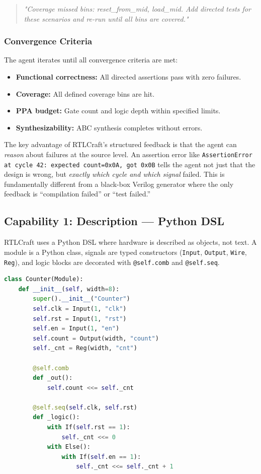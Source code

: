 \documentclass[11pt]{article}
\begin{document}
\begin{quote}
\small\textit{"Coverage missed bins: reset\_from\_mid, load\_mid. Add directed tests for these scenarios and re-run until all bins are covered."}
\end{quote}

\subsubsection{Convergence Criteria}

The agent iterates until all convergence criteria are met:

\begin{itemize}
    \item \textbf{Functional correctness:} All directed assertions pass with zero failures.
    \item \textbf{Coverage:} All defined coverage bins are hit.
    \item \textbf{PPA budget:} Gate count and logic depth within specified limits.
    \item \textbf{Synthesizability:} ABC synthesis completes without errors.
\end{itemize}

The key advantage of RTLCraft's structured feedback is that the agent can \textit{reason} about failures at the source level. An assertion error like \texttt{AssertionError at cycle 42: expected count=0x0A, got 0x0B} tells the agent not just that the design is wrong, but \textit{exactly which cycle and which signal} failed. This is fundamentally different from a black-box Verilog generator where the only feedback is ``compilation failed'' or ``test failed.''

\subsection{Capability 1: Description --- Python DSL}
\label{sec:cap_desc}

RTLCraft uses a Python DSL where hardware is described as objects, not text. A module is a Python class, signals are typed constructors (\texttt{Input}, \texttt{Output}, \texttt{Wire}, \texttt{Reg}), and logic blocks are decorated with \texttt{@self.comb} and \texttt{@self.seq}.

\begin{lstlisting}[language=Python, caption={8-bit counter described in Python DSL}, label={lst:counter_dsl}]
class Counter(Module):
    def __init__(self, width=8):
        super().__init__("Counter")
        self.clk = Input(1, "clk")
        self.rst = Input(1, "rst")
        self.en = Input(1, "en")
        self.count = Output(width, "count")
        self._cnt = Reg(width, "cnt")

        @self.comb
        def _out():
            self.count <<= self._cnt

        @self.seq(self.clk, self.rst)
        def _logic():
            with If(self.rst == 1):
                self._cnt <<= 0
            with Else():
                with If(self.en == 1):
                    self._cnt <<= self._cnt + 1
\end{lstlisting}
\end{document}
